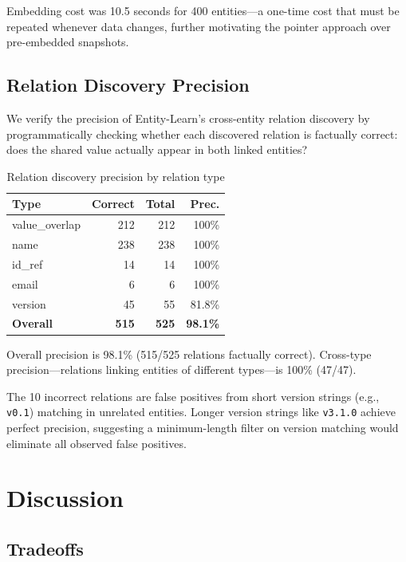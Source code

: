 \documentclass[11pt,twocolumn]{article}
\begin{document}
Embedding cost was 10.5 seconds for 400 entities---a one-time cost that must be repeated whenever data changes, further motivating the pointer approach over pre-embedded snapshots.

\subsection{Relation Discovery Precision}

We verify the precision of Entity-Learn's cross-entity relation discovery by programmatically checking whether each discovered relation is factually correct: does the shared value actually appear in both linked entities?

\begin{table}[t]
\centering\small
\caption{Relation discovery precision by relation type}
\label{tab:relation-precision}
\begin{tabular}{@{}lrrr@{}}
\toprule
\textbf{Type} & \textbf{Correct} & \textbf{Total} & \textbf{Prec.} \\
\midrule
value\_overlap & 212 & 212 & 100\% \\
name & 238 & 238 & 100\% \\
id\_ref & 14 & 14 & 100\% \\
email & 6 & 6 & 100\% \\
version & 45 & 55 & 81.8\% \\
\midrule
\textbf{Overall} & \textbf{515} & \textbf{525} & \textbf{98.1\%} \\
\bottomrule
\end{tabular}
\end{table}

Overall precision is 98.1\% (515/525 relations factually correct). Cross-type precision---relations linking entities of different types---is 100\% (47/47).

The 10 incorrect relations are false positives from short version strings (e.g., \texttt{v0.1}) matching in unrelated entities. Longer version strings like \texttt{v3.1.0} achieve perfect precision, suggesting a minimum-length filter on version matching would eliminate all observed false positives.

\section{Discussion}
\label{sec:discussion}

\subsection{Tradeoffs}
\end{document}
